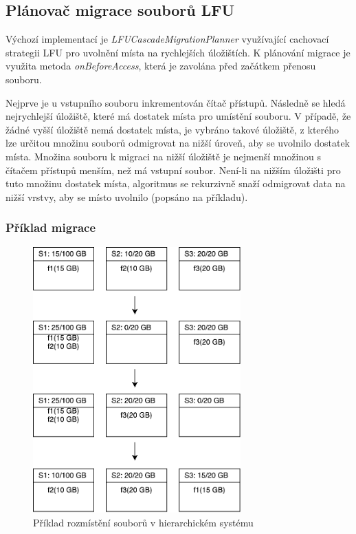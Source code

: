 \documentclass[czech,DP]{thesiskiv}
\begin{document}
\subsection{Plánovač migrace souborů LFU} \label{planovac_lru}

Výchozí implementací je \textit{LFUCascadeMigrationPlanner} využívající cachovací strategii LFU pro uvolnění místa na rychlejších úložištích. K plánování migrace je využita metoda \textit{onBeforeAccess}, která je zavolána před začátkem přenosu souboru. 

Nejprve je u vstupního souboru inkrementován čítač přístupů. Následně se hledá nejrychlejší úložiště, které má dostatek místa pro umístění souboru. V případě, že žádné vyšší úložiště nemá dostatek místa, je vybráno takové úložiště, z kterého lze určitou množinu souborů odmigrovat na nižší úroveň, aby se uvolnilo dostatek místa. Množina souboru k migraci na nižší úložiště je nejmenší množinou s čítačem přístupů menším, než má vstupní soubor. Není-li na nižším úložišti pro tuto množinu dostatek místa, algoritmus se rekurzivně snaží odmigrovat data na nižší vrstvy, aby se místo uvolnilo (popsáno na příkladu).

\subsubsection*{Příklad migrace}

\begin{figure}[H]
\centering
	\includegraphics[width=80mm]{img/hie_migrace.pdf}
\caption{Příklad rozmístění souborů v hierarchickém systému}
\label{fig:hie_migrace}
\end{figure}
\end{document}
